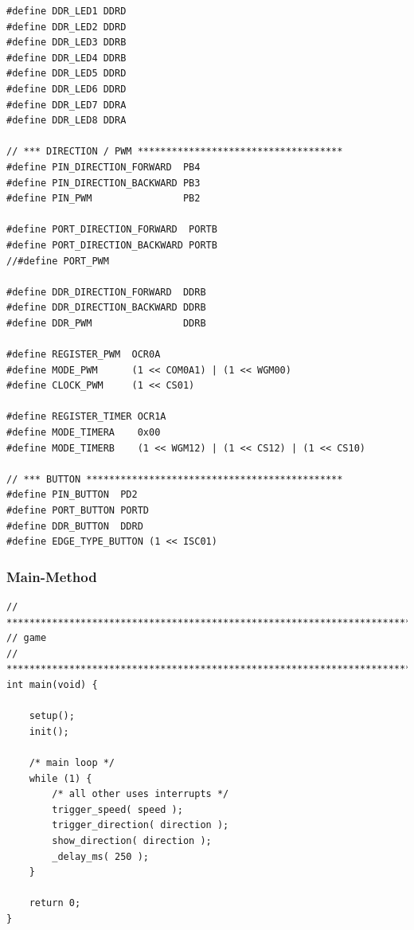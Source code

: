 \begin{lstlisting}[caption={Defines},label=lst:defines]
#define DDR_LED1 DDRD
#define DDR_LED2 DDRD
#define DDR_LED3 DDRB
#define DDR_LED4 DDRB
#define DDR_LED5 DDRD
#define DDR_LED6 DDRD
#define DDR_LED7 DDRA
#define DDR_LED8 DDRA

// *** DIRECTION / PWM ************************************
#define PIN_DIRECTION_FORWARD  PB4
#define PIN_DIRECTION_BACKWARD PB3
#define PIN_PWM                PB2

#define PORT_DIRECTION_FORWARD  PORTB
#define PORT_DIRECTION_BACKWARD PORTB
//#define PORT_PWM

#define DDR_DIRECTION_FORWARD  DDRB
#define DDR_DIRECTION_BACKWARD DDRB
#define DDR_PWM                DDRB

#define REGISTER_PWM  OCR0A
#define MODE_PWM      (1 << COM0A1) | (1 << WGM00)
#define CLOCK_PWM     (1 << CS01)

#define REGISTER_TIMER OCR1A
#define MODE_TIMERA    0x00
#define MODE_TIMERB    (1 << WGM12) | (1 << CS12) | (1 << CS10)

// *** BUTTON *********************************************
#define PIN_BUTTON  PD2
#define PORT_BUTTON PORTD
#define DDR_BUTTON  DDRD
#define EDGE_TYPE_BUTTON (1 << ISC01)
\end{lstlisting}
\vspace{0.5cm}

\subsubsection{Main-Method}
\begin{lstlisting}[caption={Main-Method},label=lst:main]
// ****************************************************************************
// game
// ***************************************************************************/
int main(void) {

	setup();
	init();

	/* main loop */
	while (1) {
		/* all other uses interrupts */
		trigger_speed( speed );
		trigger_direction( direction );
		show_direction( direction );
		_delay_ms( 250 );
	}

	return 0;
}
\end{lstlisting}
\vspace{0.5cm}

